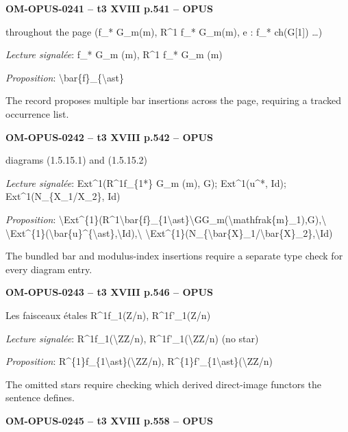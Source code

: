 \par\noindent\textbf{OM-OPUS-0241 -- t3 XVIII p.541 -- OPUS}\par
throughout the page (f\_* G\_m(m), R\textasciicircum{}1 f\_* G\_m(m), e : f\_* ch(G[1]) …)\par
\emph{Lecture signalée}: f\_* G\_m (m), R\textasciicircum{}1 f\_* G\_m (m)\par
\emph{Proposition}: \textbackslash{}bar\{f\}\_\{\textbackslash{}ast\}\par
The record proposes multiple bar insertions across the page, requiring a tracked occurrence list.\par
\par\noindent\textbf{OM-OPUS-0242 -- t3 XVIII p.542 -- OPUS}\par
diagrams (1.5.15.1) and (1.5.15.2)\par
\emph{Lecture signalée}: Ext\textasciicircum{}1(R\textasciicircum{}1f\_\{1*\} G\_m (m), G); Ext\textasciicircum{}1(u\textasciicircum{}*, Id); Ext\textasciicircum{}1(N\_\{X\_1/X\_2\}, Id)\par
\emph{Proposition}: \textbackslash{}Ext\textasciicircum{}\{1\}(R\textasciicircum{}1\textbackslash{}bar\{f\}\_\{1\textbackslash{}ast\}\textbackslash{}GG\_m(\textbackslash{}mathfrak\{m\}\_1),G),\textbackslash{} \textbackslash{}Ext\textasciicircum{}\{1\}(\textbackslash{}bar\{u\}\textasciicircum{}\{\textbackslash{}ast\},\textbackslash{}Id),\textbackslash{} \textbackslash{}Ext\textasciicircum{}\{1\}(N\_\{\textbackslash{}bar\{X\}\_1/\textbackslash{}bar\{X\}\_2\},\textbackslash{}Id)\par
The bundled bar and modulus-index insertions require a separate type check for every diagram entry.\par
\par\noindent\textbf{OM-OPUS-0243 -- t3 XVIII p.546 -- OPUS}\par
Les faisceaux étales R\textasciicircum{}1f\_1(Z/n), R\textasciicircum{}1f'\_1(Z/n)\par
\emph{Lecture signalée}: R\textasciicircum{}1f\_1(\textbackslash{}ZZ/n), R\textasciicircum{}1f'\_1(\textbackslash{}ZZ/n) (no star)\par
\emph{Proposition}: R\textasciicircum{}\{1\}f\_\{1\textbackslash{}ast\}(\textbackslash{}ZZ/n), R\textasciicircum{}\{1\}f'\_\{1\textbackslash{}ast\}(\textbackslash{}ZZ/n)\par
The omitted stars require checking which derived direct-image functors the sentence defines.\par
\par\noindent\textbf{OM-OPUS-0245 -- t3 XVIII p.558 -- OPUS}\par
